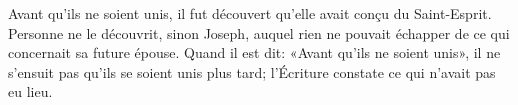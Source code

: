Avant qu’ils ne soient unis,
	il fut découvert qu’elle avait conçu du Saint-Esprit.
Personne ne le découvrit, sinon Joseph,
	auquel rien ne pouvait échapper de ce qui concernait sa future épouse.
Quand il est dit: «Avant qu’ils ne soient unis»,
	il ne s’ensuit pas qu’ils se soient unis plus tard;
	l’Écriture constate ce qui n’avait pas eu lieu.
